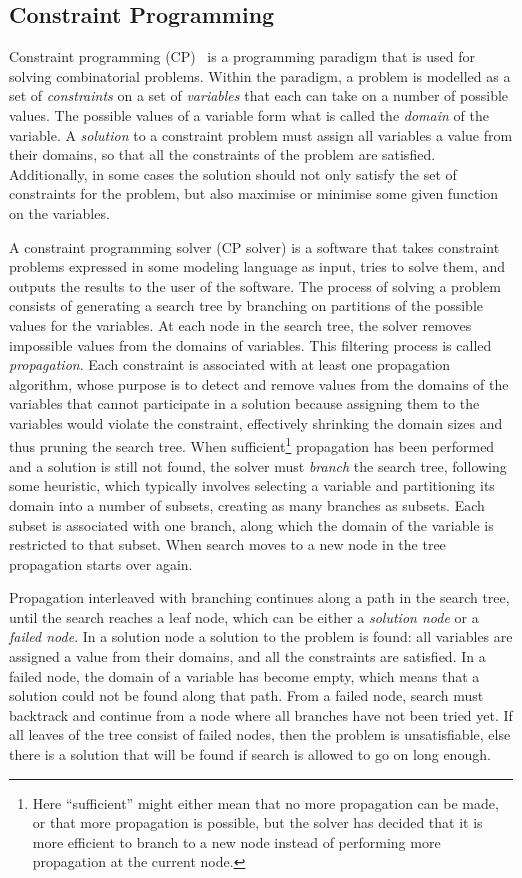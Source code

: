 \documentclass[a4paper,11pt]{article}
\numberwithin{equation}{section}
\begin{document}
\subsection{Constraint Programming}
\label{bg:cp}
Constraint programming (CP)~\cite{Apt:constraintsBook}
is a programming paradigm that is used for solving
combinatorial problems. Within the paradigm, a problem is
modelled as a set of \emph{constraints} on a
set of \emph{variables} that each can take on a number of
possible values. The possible values of 
a variable form what is called the \emph{domain} of the variable.
A \emph{solution} to a constraint problem must assign all variables
a value from their domains, so that all the constraints of the problem
are satisfied. Additionally, in some cases the solution should not only
satisfy the set of constraints for the
problem, but also maximise or minimise some given function on the variables.

A constraint programming solver (CP solver) is a software that
takes constraint problems expressed in some modeling language as input,
tries to solve them, and outputs the results to the user of the software.
The process of solving a problem consists of generating a search tree by branching
on partitions of the possible values for the variables. 
At each node in the search tree,
the solver removes impossible values from the domains of variables.
This filtering process is called \emph{propagation}. Each constraint is
associated with at least one propagation algorithm, whose purpose is to detect
and remove values from the domains of the variables
that cannot participate in a solution because assigning them to
the variables would violate the constraint,
effectively shrinking the domain sizes and thus 
pruning the search tree.
When sufficient\footnote{Here ``sufficient'' might either mean that no more
  propagation can be made, or that more propagation is possible,
  but the solver has decided that it is more efficient to branch to a new node instead of 
  performing more propagation at the current node.}
propagation has been performed and a solution is still not found,
the solver must \emph{branch} the search tree, following some heuristic,
which typically involves selecting a variable and partitioning its domain 
into a number of subsets, creating as many branches as subsets.
Each subset is associated with one branch, along which the domain
of the variable is restricted to that subset.
When search moves to a new node in the tree propagation starts over again.

Propagation interleaved with branching continues along a path in the search tree,
until the search reaches a leaf node, which can be either a
\emph{solution node} or a \emph{failed node}.
In a solution node a solution to the problem is found:
all variables are assigned a value
from their domains, and all the constraints are satisfied.
In a failed node, the domain of a variable has become empty, which
means that a solution could not be found along that path.
From a failed node, search must backtrack and continue from a node where all branches
have not been tried yet. If all leaves of the tree consist of failed nodes, then
the problem is unsatisfiable, else there is a solution that will be
found if search is allowed to go on long enough.
\end{document}
